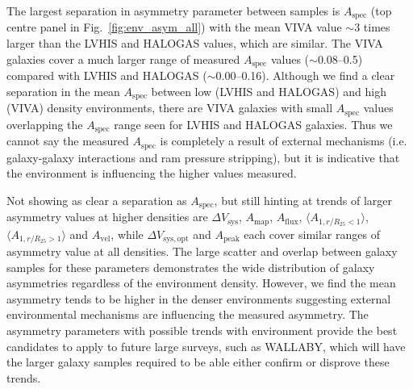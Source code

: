 \documentclass[fleqn,usenatbib]{mnras}
\begin{document}
The largest separation in asymmetry parameter between samples is $A_{\mathrm{spec}}$ (top centre panel in Fig.~\ref{fig:env_asym_all}) with the mean VIVA value $\sim3$ times larger than the LVHIS and HALOGAS values, which are similar. The VIVA galaxies cover a much larger range of measured $A_{\mathrm{spec}}$ values ($\sim$0.08--0.5) compared with LVHIS and HALOGAS ($\sim$0.00--0.16). Although we find a clear separation in the mean $A_{\mathrm{spec}}$ between low (LVHIS and HALOGAS) and high (VIVA) density environments, there are VIVA galaxies with small $A_{\mathrm{spec}}$ values overlapping the $A_{\mathrm{spec}}$ range seen for LVHIS and HALOGAS galaxies. Thus we cannot say the measured $A_{\mathrm{spec}}$ is completely a result of external mechanisms (i.e. galaxy-galaxy interactions and ram pressure stripping), but it is indicative that the environment is influencing the higher values measured.

Not showing as clear a separation as $A_{\mathrm{spec}}$, but still hinting at trends of larger asymmetry values at higher densities are $\Delta V_{\mathrm{sys}}$, $A_{\mathrm{map}}$, $A_{\mathrm{flux}}$, $\langle A_{1,r/R_{25}<1} \rangle$, $\langle A_{1,r/R_{25}>1} \rangle$ and $A_{\mathrm{vel}}$, while $\Delta V_{\mathrm{sys,opt}}$ and $A_{\mathrm{peak}}$ each cover similar ranges of asymmetry value at all densities. The large scatter and overlap between galaxy samples for these parameters demonstrates the wide distribution of galaxy asymmetries regardless of the environment density. However, we find the mean asymmetry tends to be higher in the denser environments suggesting external environmental mechanisms are influencing the measured asymmetry. The asymmetry parameters with possible trends with environment provide the best candidates to apply to future large surveys, such as WALLABY, which will have the larger galaxy samples required to be able either confirm or disprove these trends.
\end{document}
